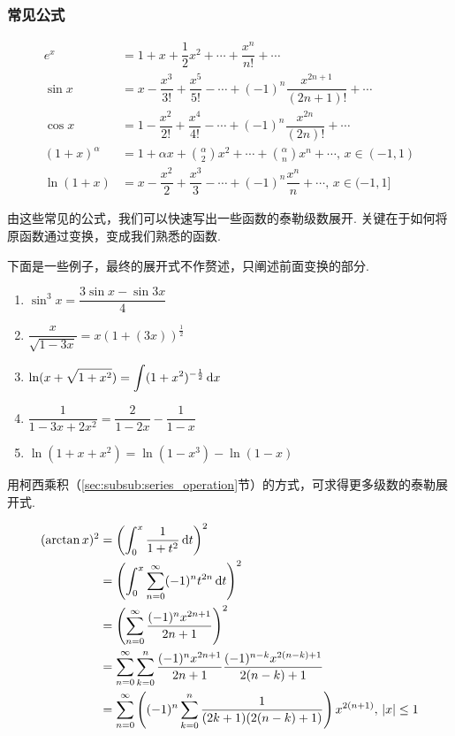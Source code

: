 \subsubsection{常见公式}
\[\begin{aligned}
e^x&=1+x+\dfrac{1}{2}x^2+\cdots+\dfrac{x^n}{n!}+\cdots\\
\sin x&=x-\dfrac{x^3}{3!}+\dfrac{x^5}{5!}-\cdots+(-1)^n\dfrac{x^{2n+1}}{(2n+1)!}+\cdots\\
\cos x&=1-\dfrac{x^2}{2!}+\dfrac{x^4}{4!}-\cdots+(-1)^n\dfrac{x^{2n}}{(2n)!}+\cdots\\
(1+x)^\alpha&=1+\alpha x+\binom{\alpha}{2}x^2+\cdots+\binom{\alpha}{n}x^n+\cdots,\,x\in(-1,1)\\
\ln(1+x)&=x-\dfrac{x^2}{2}+\dfrac{x^3}{3}-\cdots+(-1)^n\dfrac{x^n}{n}+\cdots,\,x\in(-1,1]
\end{aligned}\]
\par 由这些常见的公式，我们可以快速写出一些函数的泰勒级数展开. 关键在于如何将原函数通过变换，变成我们熟悉的函数.
\begin{example}
下面是一些例子，最终的展开式不作赘述，只阐述前面变换的部分.
\begin{enumerate}
	\item $\sin^3 x=\dfrac{3\sin x-\sin 3x}{4}$
	\item $\dfrac{x}{\sqrt{1-3x}}=x(1+(3x))^{\frac{1}{2}}$
	\item $\displaystyle\ln(x+\sqrt{1+x^2})=\int (1+x^2)^{-\frac{1}{2}}\,\mathrm{d} x$
	\item $\dfrac{1}{1-3x+2x^2}=\dfrac{2}{1-2x}-\dfrac{1}{1-x}$
	\item $\ln(1+x+x^2)=\ln(1-x^3)-\ln(1-x)$
\end{enumerate}
\end{example}
\par 用柯西乘积（\ref{sec:subsub:series_operation}节）的方式，可求得更多级数的泰勒展开式.
\begin{example}
\[\begin{aligned}
(\arctan x)^2&=\left(\int_0^x\dfrac{1}{1+t^2}\,\mathrm{d} t\right)^2\\
&=\left(\int_0^x\displaystyle\sum_{n=0}^{\infty}(-1)^nt^{2n}\,\mathrm{d} t\right)^2\\
&=\left(\displaystyle\sum_{n=0}^{\infty}\dfrac{(-1)^n x^{2 n+1}}{2 n+1}\right)^2\\
&=\displaystyle\sum_{n=0}^{\infty}\sum_{k=0}^n\dfrac{(-1)^n x^{2 n+1}}{2 n+1}\dfrac{(-1)^{n-k} x^{2 (n-k)+1}}{2 (n-k)+1}\\
&=\displaystyle\sum_{n=0}^{\infty}\left((-1)^n\sum_{k=0}^n\dfrac{1}{(2k+1)(2(n-k)+1)}\right)x^{2(n+1)},\,|x|\leq 1
\end{aligned}\]
\end{example}
